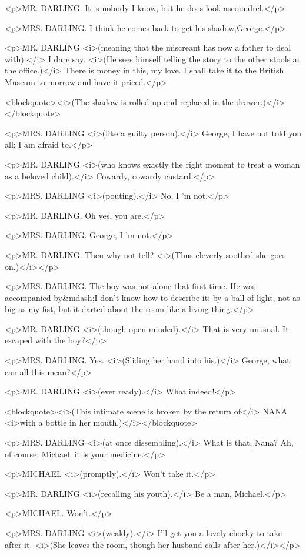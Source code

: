 <p>MR. DARLING. It is nobody I know, but he does look ascoundrel.</p>

<p>MRS. DARLING. I think he comes back to get his shadow,George.</p>

<p>MR. DARLING <i>(meaning that the miscreant has now a father to deal with).</i> I dare say. <i>(He sees himself telling the story to the other stools at the office.)</i> There is money in this, my love. I shall take it to the British Museum to-morrow and have it priced.</p>

<blockquote><i>(The shadow is rolled up and replaced in the drawer.)</i></blockquote>

<p>MRS. DARLING <i>(like a guilty person).</i> George, I have not told you all; I am afraid to.</p>

<p>MR. DARLING <i>(who knows exactly the right moment to treat a woman as a beloved child).</i> Cowardy, cowardy custard.</p>

<p>MRS. DARLING <i>(pouting).</i> No, I 'm not.</p>

<p>MR. DARLING. Oh yes, you are.</p>

<p>MRS. DARLING. George, I 'm not.</p>

<p>MR. DARLING. Then why not tell? <i>(Thus cleverly soothed she goes on.)</i></p>

<p>MRS. DARLING. The boy was not alone that first time. He was accompanied by&mdash;I don't know how to describe it; by a ball of light, not as big as my fist, but it darted about the room like a living thing.</p>

<p>MR. DARLING <i>(though open-minded).</i> That is very unusual. It escaped with the boy?</p>

<p>MRS. DARLING. Yes. <i>(Sliding her hand into his.)</i> George, what can all this mean?</p>

<p>MR. DARLING <i>(ever ready).</i> What indeed!</p>

<blockquote><i>(This intimate scene is broken by the return of</i> NANA <i>with a bottle in her mouth.)</i></blockquote>

<p>MRS. DARLING <i>(at once dissembling).</i> What is that, Nana? Ah, of course; Michael, it is your medicine.</p>

<p>MICHAEL <i>(promptly).</i> Won't take it.</p>

<p>MR. DARLING <i>(recalling his youth).</i> Be a man, Michael.</p>

<p>MICHAEL. Won't.</p>

<p>MRS. DARLING <i>(weakly).</i> I'll get you a lovely chocky to take after it. <i>(She leaves the room, though her husband calls after her.)</i></p>

